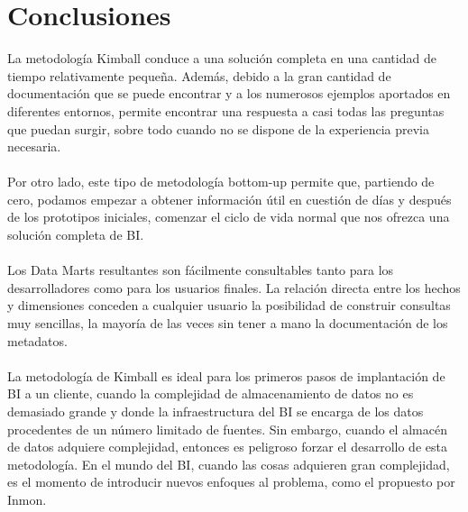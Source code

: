 \documentclass[11pt,a4paper]{article}
\begin{document}
		
		\section{Conclusiones}
		
		La metodología Kimball conduce a una solución completa en una cantidad de tiempo relativamente pequeña. Además, debido a la gran cantidad de documentación que se puede encontrar y a los numerosos ejemplos aportados en diferentes entornos, permite encontrar una respuesta a casi todas las preguntas que puedan surgir, sobre todo cuando no se dispone de la experiencia previa necesaria.\\
		\\
		Por otro lado, este tipo de metodología bottom-up permite que, partiendo de cero, podamos empezar a obtener información útil en cuestión de días y después de los prototipos iniciales, comenzar el ciclo de vida normal que nos ofrezca una solución completa de BI.\\
		\\
		Los Data Marts resultantes son fácilmente consultables tanto para los desarrolladores como para los usuarios finales. La relación directa entre los hechos y dimensiones conceden a cualquier usuario la posibilidad de construir consultas muy sencillas, la mayoría de las veces sin tener a mano la documentación de los metadatos.\\
		\\
		La metodología de Kimball es ideal para los primeros pasos de implantación de BI a un cliente, cuando la complejidad de almacenamiento de datos no es demasiado grande y donde la infraestructura del BI se encarga de los datos procedentes de un número limitado de fuentes. Sin embargo, cuando el almacén de datos adquiere complejidad, entonces es peligroso forzar el desarrollo de esta metodología. En el mundo del BI, cuando las cosas adquieren gran complejidad, es el momento de introducir nuevos enfoques al problema, como el propuesto por Inmon.
		
		
		
			
		
\end{document}
